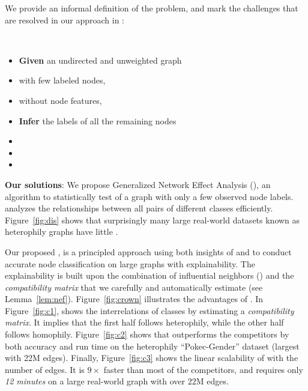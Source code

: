 We provide an informal definition of the problem, and mark the challenges that are resolved in our approach in :
\begin{iprob}~
    \vspace{-0.12cm}
	\begin{itemize}[leftmargin=20pt]
		\item {\bfseries Given} an undirected and unweighted graph
		\bit
			\item with few labeled nodes,
			\item without node features,
		\eit
		\item {\bfseries Infer} the labels of all the remaining nodes
		\bit
		    \item {}
			\item {}
			\item {}
		\eit
	\end{itemize}
\end{iprob}

{\bf Our solutions}:
We propose Generalized Network Effect Analysis (\nea), an algorithm to statistically test \nef of a graph with only a few observed node labels.
\nea analyzes the relationships between all pairs of different classes efficiently.
Figure~\ref{fig:dis} shows that surprisingly many large real-world datasets known as heterophily graphs have little \nef.

Our proposed \method, is a principled approach using both insights of \nef and \nd to conduct accurate node classification on large graphs with explainability.
The explainability is built upon the combination of influential neighbors (\nd) and the \emph{compatibility matrix} that we carefully and automatically estimate (see Lemma~\ref{lem:nef}).
Figure~\ref{fig:crown} illustrates the advantages of \method.
In Figure~\ref{fig:c1}, \method shows the interrelations of classes by estimating a \emph{compatibility matrix}. It implies that the first half follows heterophily, while the other half follows homophily.
Figure~\ref{fig:c2} shows that \method outperforms the competitors by both accuracy and run time on the heterophily ``Pokec-Gender'' dataset (largest with 22M edges).
Finally, Figure~\ref{fig:c3} shows the linear scalability of \method with the number of edges. It is $9\times$ faster than most of the competitors, and requires only {\em 12 minutes} on a large real-world graph with over $22$M edges.


